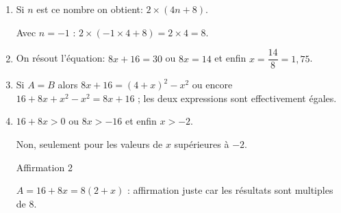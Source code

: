 
\medskip

\begin{enumerate}
\item Si $n$ est ce nombre on obtient: $2 \times (4n + 8)$.

Avec $n = - 1$ :  $2 \times(-1  \times 4 + 8) = 2 \times 4 = 8$.
\item  On résout l'équation: $8x + 16 = 30$ ou
$8x = 14$ et enfin $x = \dfrac{14}{8} = 1,75$.
\item  Si $A = B$ alors
$8x + 16 = (4 + x)^2 - x^2$ ou encore  $16 + 8x + x^2 - x^2 = 8x + 16$ ; 
les deux expressions sont  effectivement égales.
\item  $16 + 8x > 0$ ou  $8x > - 16$ et enfin  $x > - 2$.

Non, seulement pour les valeurs de $x$ supérieures à $-2$.

Affirmation 2

$A = 16 + 8x = 8(2 + x)$ :  affirmation juste car les résultats sont multiples de 8.
\end{enumerate}

\bigskip


